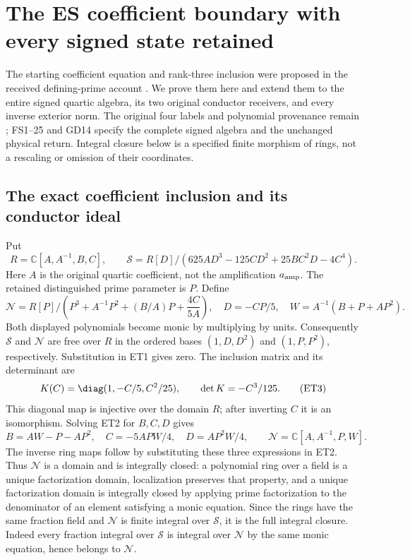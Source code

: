 \section{The ES coefficient boundary with every signed state retained}
\label{sec:es-total-extension}
The starting coefficient equation and rank-three inclusion were proposed
in the received defining-prime account \cite[eqs.\ (3)--(8)]{DefiningPrimeReceived}.
We prove them here and extend them to the entire signed quartic algebra,
its two original conductor receivers, and every inverse exterior norm.
The original four labels and polynomial provenance remain
\cite{ES488,Tao}; FS1--25 and GD14 specify the complete signed algebra
and the unchanged physical return. Integral closure below is a specified
finite morphism of rings, not a rescaling or omission of their coordinates.

\subsection{The exact coefficient inclusion and its conductor ideal}
Put
\[
 R=\mathbb C[A,A^{-1},B,C],\qquad
 \mathscr S=R[D]/(625AD^3-125CD^2+25BC^2D-4C^4).
 \tag{ET1}
\]
Here $A$ is the original quartic coefficient, not the amplification
$a_{\rm amp}$. The retained distinguished prime parameter is $P$.
Define
\[
 \mathscr N=R[P]/\left(P^3+A^{-1}P^2+(B/A)P+\frac{4C}{5A}\right),
 \quad D=-CP/5,\quad W=A^{-1}(B+P+AP^2).
 \tag{ET2}
\]
Both displayed polynomials become monic by multiplying by units.
Consequently $\mathscr S$ and $\mathscr N$ are free over $R$ in the
ordered bases $(1,D,D^2)$ and $(1,P,P^2)$, respectively. Substitution
in ET1 gives zero. The inclusion matrix and its determinant are
\[
 K(C)=\diag(1,-C/5,C^2/25),\qquad \det K=-C^3/125.
 \tag{ET3}
\]
This diagonal map is injective over the domain $R$; after inverting
$C$ it is an isomorphism. Solving ET2 for $B,C,D$ gives
\[
 B=AW-P-AP^2,\quad C=-5APW/4,\quad D=AP^2W/4,
 \qquad \mathscr N=\mathbb C[A,A^{-1},P,W].
 \tag{ET4}
\]
The inverse ring maps follow by substituting these three expressions
in ET2. Thus $\mathscr N$ is a domain and is integrally closed:
a polynomial ring over a field is a unique factorization domain,
localization preserves that property, and a unique factorization
domain is integrally closed by applying prime factorization to the
denominator of an element satisfying a monic equation.
Since the rings have the same fraction field and $\mathscr N$ is
finite integral over $\mathscr S$, it is the full integral closure.
Indeed every fraction integral over $\mathscr S$ is integral over
$\mathscr N$ by the same monic equation, hence belongs to $\mathscr N$.

